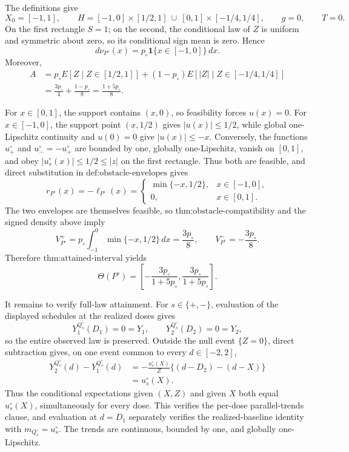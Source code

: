 The definitions give
\[
 X_0=[-1,1],
 \qquad
 H=[-1,0]\times[1/2,1]\ \cup\ [0,1]\times[-1/4,1/4],
 \qquad g=0,
 \qquad T=0.
\]
On the first rectangle \(S=1\); on the second, the conditional law of \(Z\) is uniform and symmetric about zero, so its conditional sign mean is zero.  Hence
\[
 d\nu_{P^{\circ}}(x)=p_{\circ}\mathbf 1\{x\in[-1,0]\}\,dx.
\]
Moreover,
\[
 \begin{aligned}
 A
 &=p_{\circ}E[Z\mid Z\in[1/2,1]]
 +(1-p_{\circ})E[|Z|\mid Z\in[-1/4,1/4]]\\
 &=\frac{3p_{\circ}}4+\frac{1-p_{\circ}}8
 =\frac{1+5p_{\circ}}8.
 \end{aligned}
\]

For \(x\in[0,1]\), the support contains \((x,0)\), so feasibility forces \(u(x)=0\).  For \(x\in[-1,0]\), the support point \((x,1/2)\) gives \(|u(x)|\leq1/2\), while global one-Lipschitz continuity and \(u(0)=0\) give \(|u(x)|\leq-x\).  Conversely, the functions \(u_+^{\circ}\) and \(u_-^{\circ}=-u_+^{\circ}\) are bounded by one, globally one-Lipschitz, vanish on \([0,1]\), and obey \(|u_s^{\circ}(x)|\leq1/2\leq|z|\) on the first rectangle.  Thus both are feasible, and direct substitution in \(\text{def:obstacle-envelopes}\) gives
\[
 r_{P^{\circ}}(x)=-\ell_{P^{\circ}}(x)
 =\begin{cases}
 \min\{-x,1/2\},&x\in[-1,0],\\
 0,&x\in[0,1].
 \end{cases}
\]
The two envelopes are themselves feasible, so \(\text{thm:obstacle-compatibility}\) and the signed density above imply
\[
 V_{P^{\circ}}^+
 =p_{\circ}\int_{-1}^0\min\{-x,1/2\}\,dx
 =\frac{3p_{\circ}}8,
 \qquad
 V_{P^{\circ}}^-=-\frac{3p_{\circ}}8.
\]
Therefore \(\text{thm:attained-interval}\) yields
\[
 \Theta(P^{\circ})=
 \left[-\frac{3p_{\circ}}{1+5p_{\circ}},
         \frac{3p_{\circ}}{1+5p_{\circ}}\right].
\]

It remains to verify full-law attainment.  For \(s\in\{+,-\}\), evaluation of the displayed schedules at the realized doses gives
\[
 Y_1^{Q_s^{\circ}}(D_1)=0=Y_1,
 \qquad
 Y_2^{Q_s^{\circ}}(D_2)=0=Y_2,
\]
so the entire observed law is preserved.  Outside the null event \(\{Z=0\}\), direct subtraction gives, on one event common to every \(d\in[-2,2]\),
\[
 \begin{aligned}
 Y_2^{Q_s^{\circ}}(d)-Y_1^{Q_s^{\circ}}(d)
 &=-\frac{u_s^{\circ}(X)}Z\{(d-D_2)-(d-X)\}\\
 &=u_s^{\circ}(X).
 \end{aligned}
\]
Thus the conditional expectations given \((X,Z)\) and given \(X\) both equal \(u_s^{\circ}(X)\), simultaneously for every dose.  This verifies the per-dose parallel-trends clause, and evaluation at \(d=D_1\) separately verifies the realized-baseline identity with \(m_{Q_s^{\circ}}=u_s^{\circ}\).  The trends are continuous, bounded by one, and globally one-Lipschitz.


